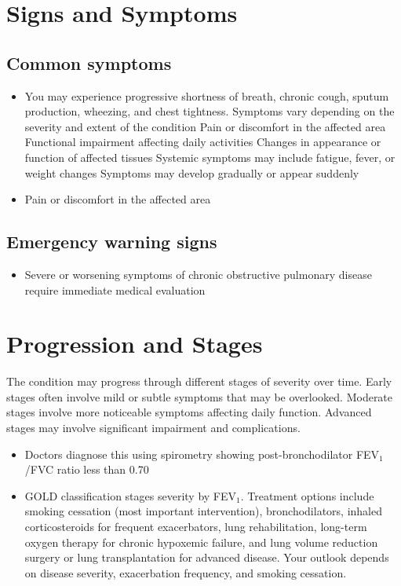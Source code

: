 \section{Signs and Symptoms}

\subsection{Common symptoms}
\begin{itemize}[noitemsep]
  \item You may experience progressive shortness of breath, chronic cough, sputum production, wheezing, and chest tightness. Symptoms vary depending on the severity and extent of the condition Pain or discomfort in the affected area Functional impairment affecting daily activities Changes in appearance or function of affected tissues Systemic symptoms may include fatigue, fever, or weight changes Symptoms may develop gradually or appear suddenly
  \item Pain or discomfort in the affected area
  \end{itemize}

\subsection{Emergency warning signs}
\begin{itemize}[noitemsep]
  \item Severe or worsening symptoms of chronic obstructive pulmonary disease require immediate medical evaluation
\end{itemize}
\section{Progression and Stages}
The condition may progress through different stages of severity over time. Early stages often involve mild or subtle symptoms that may be overlooked. Moderate stages involve more noticeable symptoms affecting daily function. Advanced stages may involve significant impairment and complications.

\begin{itemize}[noitemsep]
  \item Doctors diagnose this using spirometry showing post-bronchodilator FEV$_1$/FVC ratio less than 0.70
  \item GOLD classification stages severity by FEV$_1$. Treatment options include smoking cessation (most important intervention), bronchodilators, inhaled corticosteroids for frequent exacerbators, lung rehabilitation, long-term oxygen therapy for chronic hypoxemic failure, and lung volume reduction surgery or lung transplantation for advanced disease. Your outlook depends on disease severity, exacerbation frequency, and smoking cessation.
\end{itemize}
